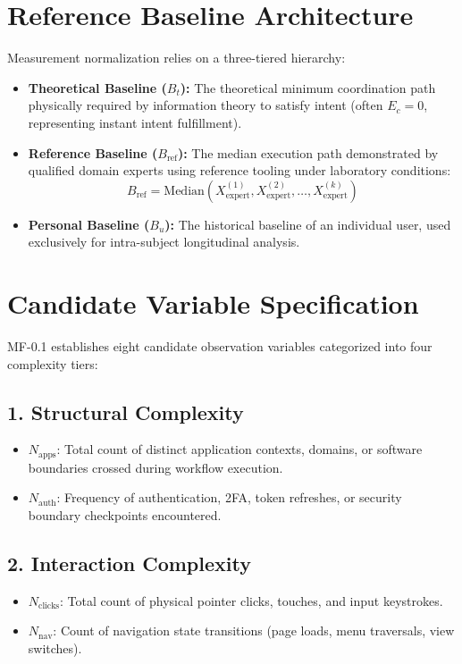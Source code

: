 \documentclass[11pt,a4paper]{article}
\begin{document}
\section{Reference Baseline Architecture}
Measurement normalization relies on a three-tiered hierarchy:
\begin{itemize}
    \item \textbf{Theoretical Baseline ($B_t$):} The theoretical minimum coordination path physically required by information theory to satisfy intent (often $E_c = 0$, representing instant intent fulfillment).
    \item \textbf{Reference Baseline ($B_{\text{ref}}$):} The median execution path demonstrated by qualified domain experts using reference tooling under laboratory conditions:
    \begin{equation}
    B_{\text{ref}} = \text{Median}\left(X_{\text{expert}}^{(1)}, X_{\text{expert}}^{(2)}, \dots, X_{\text{expert}}^{(k)}\right)
    \end{equation}
    \item \textbf{Personal Baseline ($B_u$):} The historical baseline of an individual user, used exclusively for intra-subject longitudinal analysis.
\end{itemize}

\section{Candidate Variable Specification}
MF-0.1 establishes eight candidate observation variables categorized into four complexity tiers:

\subsection{1. Structural Complexity}
\begin{itemize}
    \item $N_{\text{apps}}$: Total count of distinct application contexts, domains, or software boundaries crossed during workflow execution.
    \item $N_{\text{auth}}$: Frequency of authentication, 2FA, token refreshes, or security boundary checkpoints encountered.
\end{itemize}

\subsection{2. Interaction Complexity}
\begin{itemize}
    \item $N_{\text{clicks}}$: Total count of physical pointer clicks, touches, and input keystrokes.
    \item $N_{\text{nav}}$: Count of navigation state transitions (page loads, menu traversals, view switches).
\end{itemize}
\end{document}
